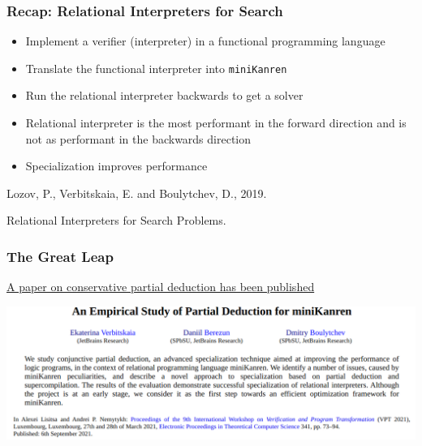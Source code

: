 \documentclass{beamer}
\newcommand{\miniKanren}{\texttt{miniKanren}\xspace}
\begin{document}
\begin{frame}[fragile]
  \frametitle{Recap: Relational Interpreters for Search}
  \begin{itemize}
    \item Implement a verifier (interpreter) in a functional programming language
    \item Translate the functional interpreter into \miniKanren
    \item Run the relational interpreter backwards to get a solver
  \end{itemize}

  \vfill

  \begin{itemize}
    \item Relational interpreter is the most performant in the forward direction and is not as performant in the backwards direction
    \item Specialization improves performance
  \end{itemize}

  \vfill

  \begin{center}
    Lozov, P., Verbitskaia, E. and Boulytchev, D., 2019.

    Relational Interpreters for Search Problems.
\end{center}

\end{frame}

\begin{frame}[fragile]
  \frametitle{The Great Leap}
\begin{center}
  \href{http://eptcs.web.cse.unsw.edu.au/paper.cgi?VPT2021.5}{A paper on conservative partial deduction has been published}
\end{center}

\vspace{1cm}

\begin{center}
  \includegraphics[width=\textwidth]{pics/paper.png}
\end{center}
\end{frame}
\end{document}

